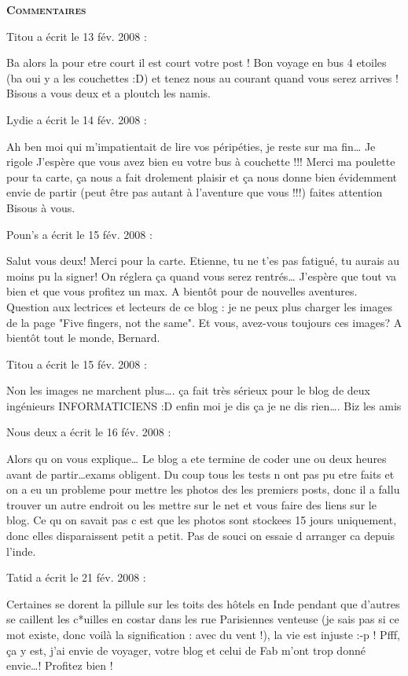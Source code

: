 \bigskip
\textbf{\textsc{Commentaires}}

\medskip
Titou a écrit le 13 fév. 2008 :
\begin{displayquote}
Ba alors la pour etre court il est court votre post ! Bon voyage en bus 4 etoiles (ba oui y a les couchettes :D) et tenez nous au courant quand vous serez arrives ! Bisous a vous deux et a ploutch les namis.
\end{displayquote}

\medskip
Lydie a écrit le 14 fév. 2008 :
\begin{displayquote}
Ah ben moi qui m'impatientait de lire vos péripéties, je reste sur ma fin\dots
Je rigole
J'espère que vous avez bien eu votre bus à couchette !!!
Merci ma poulette pour ta carte, ça nous a fait drolement plaisir et ça nous donne bien évidemment envie de partir (peut être pas autant à l'aventure que vous !!!)
faites attention
Bisous à vous.
\end{displayquote}

\medskip
Poun's a écrit le 15 fév. 2008 :
\begin{displayquote}
Salut vous deux! Merci pour la carte. Etienne, tu ne t'es pas fatigué, tu aurais au moins pu la signer! On réglera ça quand vous serez rentrés\dots
J'espère que tout va bien et que vous profitez un max.
A bientôt pour de nouvelles aventures.
Question aux lectrices et lecteurs de ce blog : je ne peux plus charger les images de la page "Five fingers, not the same". Et vous, avez-vous toujours ces images?
A bientôt tout le monde, Bernard.
\end{displayquote}

\medskip
Titou a écrit le 15 fév. 2008 :
\begin{displayquote}
Non les images ne marchent plus\dots. ça fait très sérieux pour le blog de deux ingénieurs INFORMATICIENS :D enfin moi je dis ça je ne dis rien\dots. Biz les amis
\end{displayquote}

\medskip
Nous deux a écrit le 16 fév. 2008 :
\begin{displayquote}
Alors qu on vous explique\dots
Le blog a ete termine de coder une ou deux heures avant de partir\dots exams obligent. Du coup tous les tests n ont pas pu etre faits et on a eu un probleme pour mettre les photos des les premiers posts, donc il a fallu trouver un autre endroit ou les mettre sur le net et vous faire des liens sur le blog. Ce qu on savait pas c est que les photos sont stockees 15 jours uniquement, donc elles disparaissent petit a petit. Pas de souci on essaie d arranger ca depuis l'inde.
\end{displayquote}

\medskip
Tatid a écrit le 21 fév. 2008 :
\begin{displayquote}
Certaines se dorent la pillule sur les toits des hôtels en Inde pendant que d'autres se caillent les c*uilles en costar dans les rue Parisiennes venteuse (je sais pas si ce mot existe, donc voilà la signification : avec du vent !), la vie est injuste :-p !
Pfff, ça y est, j'ai envie de voyager, votre blog et celui de Fab m'ont trop donné envie\dots ! Profitez bien !
\end{displayquote}

\vfill
